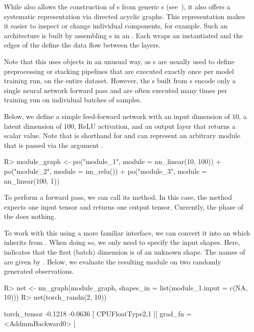 \documentclass[article]{jss}
\theoremstyle{definition}
\begin{document}
While  also allows the construction of s from generic s (see~), it also offers a systematic representation via directed acyclic graphs. This representation makes it easier to inspect or change individual components, for example.
Such an architecture is built by assembling s in an .
Each  wraps an instantiated  and the edges of the  define the data flow between the layers.

Note that this uses  objects in an unusual way, as
 s are usually used to define preprocessing or stacking pipelines that are executed exactly once per model training run, on the entire dataset.
However, the s built from s encode only a single neural network forward pass and are often executed many times per training run on individual batches of samples.

Below, we define a simple feed-forward network with an input dimension of $10$, a latent dimension of $100$, ReLU activation, and an output layer that returns a scalar value.
Note that  is shorthand for  and can represent an arbitrary \torch{} module that is passed via the argument .

\begin{CodeInput}
R> module_graph <- po("module_1", module = nn_linear(10, 100)) %
+   po("module_2", module = nn_relu()) %
+   po("module_3", module = nn_linear(100, 1))
\end{CodeInput}

To perform a forward pass, we can call its  method.
In this case, the method expects one input tensor and returns one output tensor.
Currently, the  phase of the  does nothing.

To work with this  using a more familiar interface, we can convert it into an  which inherits from .
When doing so, we only need to specify the input shapes. Here,  indicates that the first (batch) dimension is of an unknown shape.
The names of  are given by .
Below, we evaluate the resulting module on two randomly generated observations.

\begin{CodeInput}
R> net <- nn_graph(module_graph, shapes_in = list(module_1.input = c(NA, 10)))
R> net(torch_randn(2, 10))
\end{CodeInput}
\begin{CodeOutput}
torch_tensor
-0.1218
-0.0636
[ CPUFloatType{2,1} ][ grad_fn = <AddmmBackward0> ]
\end{CodeOutput}
\end{document}
